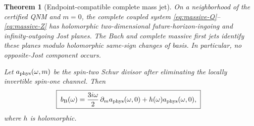 \documentclass[11pt]{article}
\newtheorem{theorem}{Theorem}[section]
\theoremstyle{remark}
\begin{document}
\begin{theorem}[Endpoint-compatible complete mass jet]
\label{thm:mass-jost}
On a neighborhood of the certified QNM and \(m=0\), the complete coupled
system \eqref{eq:massive-Q}--\eqref{eq:massive-Z} has holomorphic
two-dimensional future-horizon-ingoing and infinity-outgoing Jost planes.
The Bach and complete massive first jets identify these planes modulo
holomorphic same-sign changes of basis.  In particular, no opposite-Jost
component occurs.

Let \(a_{\rm phys}(\omega,m)\) be the spin-two Schur divisor after
eliminating the locally invertible spin-one channel.  Then
\begin{equation}\label{eq:jost-mass-crosswalk}
 \boxed{\;
 b_{\rm B}(\omega)
 =\frac{3i\omega}{2}\,
   \partial_m a_{\rm phys}(\omega,0)
   +h(\omega)a_{\rm phys}(\omega,0),
 \;}
\end{equation}
where \(h\) is holomorphic.
\end{theorem}
\end{document}
